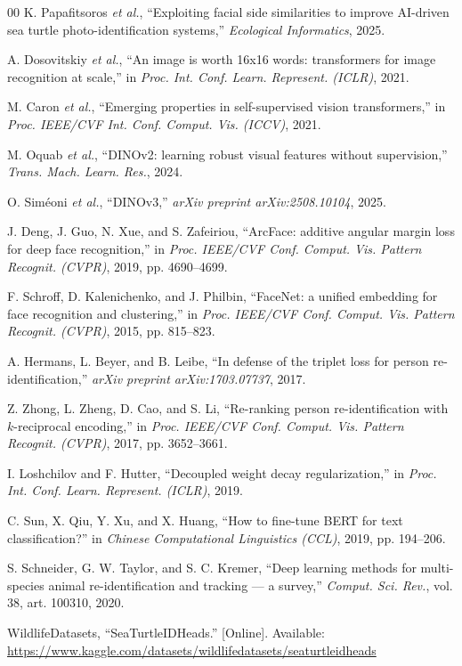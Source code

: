\documentclass[conference]{IEEEtran}
\begin{document}
\begin{thebibliography}{00}
  K. Papafitsoros \emph{et al.}, ``Exploiting facial side similarities to improve AI-driven
  sea turtle photo-identification systems,'' \emph{Ecological Informatics}, 2025.

  A. Dosovitskiy \emph{et al.}, ``An image is worth 16x16 words: transformers for image
  recognition at scale,'' in \emph{Proc. Int. Conf. Learn. Represent. (ICLR)}, 2021.

  M. Caron \emph{et al.}, ``Emerging properties in self-supervised vision transformers,''
  in \emph{Proc. IEEE/CVF Int. Conf. Comput. Vis. (ICCV)}, 2021.

  M. Oquab \emph{et al.}, ``DINOv2: learning robust visual features without supervision,''
  \emph{Trans. Mach. Learn. Res.}, 2024.

  O. Sim\'{e}oni \emph{et al.}, ``DINOv3,'' \emph{arXiv preprint arXiv:2508.10104}, 2025.

  J. Deng, J. Guo, N. Xue, and S. Zafeiriou, ``ArcFace: additive angular margin loss for
  deep face recognition,'' in \emph{Proc. IEEE/CVF Conf. Comput. Vis. Pattern Recognit.
    (CVPR)}, 2019, pp. 4690--4699.

  F. Schroff, D. Kalenichenko, and J. Philbin, ``FaceNet: a unified embedding for face
  recognition and clustering,'' in \emph{Proc. IEEE/CVF Conf. Comput. Vis. Pattern
    Recognit. (CVPR)}, 2015, pp. 815--823.

  A. Hermans, L. Beyer, and B. Leibe, ``In defense of the triplet loss for person
  re-identification,'' \emph{arXiv preprint arXiv:1703.07737}, 2017.

  Z. Zhong, L. Zheng, D. Cao, and S. Li, ``Re-ranking person re-identification with
  $k$-reciprocal encoding,'' in \emph{Proc. IEEE/CVF Conf. Comput. Vis. Pattern Recognit.
    (CVPR)}, 2017, pp. 3652--3661.

  I. Loshchilov and F. Hutter, ``Decoupled weight decay regularization,'' in \emph{Proc.
    Int. Conf. Learn. Represent. (ICLR)}, 2019.

  C. Sun, X. Qiu, Y. Xu, and X. Huang, ``How to fine-tune BERT for text classification?''
  in \emph{Chinese Computational Linguistics (CCL)}, 2019, pp. 194--206.

  S. Schneider, G. W. Taylor, and S. C. Kremer, ``Deep learning methods for multi-species
  animal re-identification and tracking --- a survey,'' \emph{Comput. Sci. Rev.}, vol. 38,
  art. 100310, 2020.

  WildlifeDatasets, ``SeaTurtleIDHeads.'' [Online]. Available:
  \url{https://www.kaggle.com/datasets/wildlifedatasets/seaturtleidheads}

\end{thebibliography}
\end{document}
